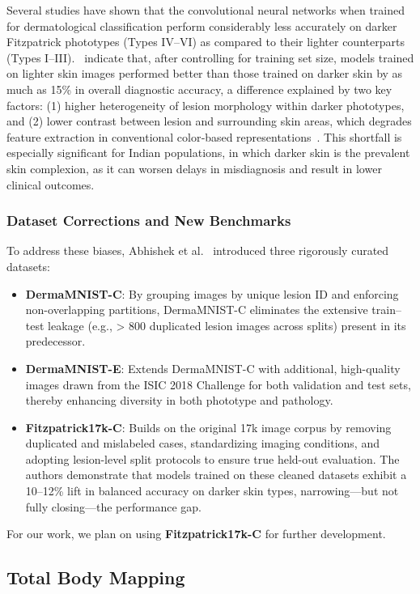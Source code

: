 Several studies have shown that the convolutional neural networks when trained for dermatological classification perform considerably less accurately on darker Fitzpatrick phototypes (Types IV–VI) as compared to their lighter counterparts (Types I–III).~\cite{abhi} indicate that, after controlling for training set size, models trained on lighter skin images performed better than those trained on darker skin by as much as 15\% in overall diagnostic accuracy, a difference explained by two key factors: (1) higher heterogeneity of lesion morphology within darker phototypes, and (2) lower contrast between lesion and surrounding skin areas, which degrades feature extraction in conventional color‐based representations~\cite{abhi}. This shortfall is especially significant for Indian populations, in which darker skin is the prevalent skin complexion, as it can worsen delays in misdiagnosis and result in lower clinical outcomes.

\subsubsection{Dataset Corrections and New Benchmarks}
To address these biases, Abhishek et al.~\cite{abhi} introduced three rigorously curated datasets:
\begin{itemize}
    \item \textbf{DermaMNIST-C}: By grouping images by unique lesion ID and enforcing non-overlapping partitions, DermaMNIST-C eliminates the extensive train–test leakage (e.g., > 800 duplicated lesion images across splits) present in its predecessor.
    \item \textbf{DermaMNIST-E}: Extends DermaMNIST-C with additional, high-quality images drawn from the ISIC 2018 Challenge for both validation and test sets, thereby enhancing diversity in both phototype and pathology.
    \item \textbf{Fitzpatrick17k-C}: Builds on the original 17k image corpus by removing duplicated and mislabeled cases, standardizing imaging conditions, and adopting lesion-level split protocols to ensure true held-out evaluation. The authors demonstrate that models trained on these cleaned datasets exhibit a 10–12\% lift in balanced accuracy on darker skin types, narrowing—but not fully closing—the performance gap.
\end{itemize}

For our work, we plan on using \textbf{Fitzpatrick17k-C} for further development. 

\subsection{Total Body Mapping}


